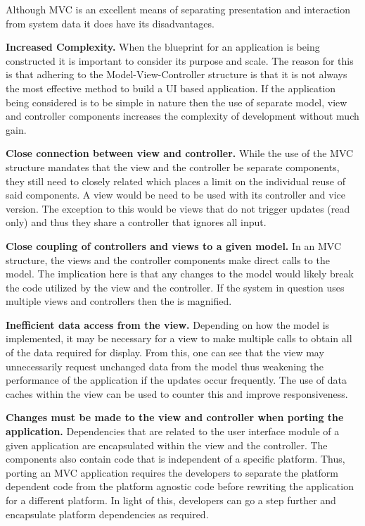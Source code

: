 Although MVC is an excellent means of separating presentation and interaction from system data it
does have its disadvantages. \par

\textbf{Increased Complexity.} When the blueprint for an application is being constructed it is important to consider its purpose
and scale. The reason for this is that adhering to the Model-View-Controller
structure is that it is not always the most effective method to build a UI based application. If the application being considered is
to be simple in nature then the use of separate model, view and controller components increases the complexity of development without
much gain. \par

\textbf{Close connection between view and controller.} While the use of the MVC structure mandates that the
view and the controller be separate components, they still need to closely related which places a limit on the individual
reuse of said components. A view would be need to be used with its controller and vice version. The exception to this would be
views that do not trigger updates (read only) and thus they share a controller that ignores all input.\par

\textbf{Close coupling of controllers and views to a given model.} In an MVC structure, the views and the controller components
make direct calls to the model. The implication here is that any changes to the model would likely break the code utilized by the view and
the controller. If the system in question uses multiple views and controllers then the is magnified. \par

\textbf{Inefficient data access from the view.} Depending on how the model is implemented, it may be necessary for a view to
make multiple calls to obtain all of the data required for display. From this, one can see that the view may unnecessarily request unchanged
data from the model thus weakening the performance of the application if the updates occur frequently. The use of data caches within the view can
be used to counter this and improve responsiveness.\par

\textbf{Changes must be made to the view and controller when porting the application.} Dependencies that are related to the user interface module
of a given application are encapsulated within the view and the controller. The components also contain code that is independent of a specific platform.
Thus, porting an MVC application requires the developers to separate the platform dependent code from the platform agnostic code before rewriting
the application for a different platform. In light of this, developers can go a step further and encapsulate platform dependencies as required.\par

